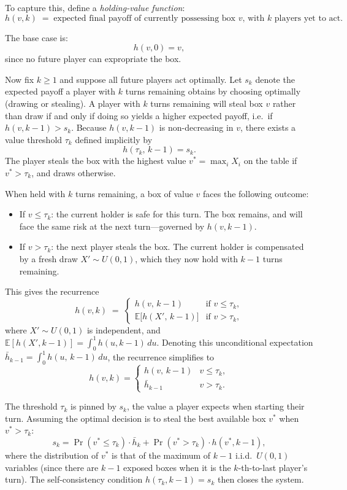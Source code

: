 \documentclass{article}
\begin{document}
To capture this, define a \emph{holding-value function}:
\[
h(v, k) \;=\; \text{expected final payoff of currently possessing box } v \text{, with } k \text{ players yet to act.}
\]

The base case is:
\[
h(v, 0) = v,
\]
since no future player can expropriate the box.

Now fix $k \geq 1$ and suppose all future players act optimally.
Let $s_k$ denote the expected payoff a player with $k$ turns remaining obtains by choosing optimally (drawing or stealing).
A player with $k$ turns remaining will steal box $v$ rather than draw if and only if doing so yields a higher expected payoff, i.e.\ if $h(v, k-1) > s_k$.
Because $h(v, k-1)$ is non-decreasing in $v$, there exists a value threshold $\tau_k$ defined implicitly by
\[
h(\tau_k,\, k-1) = s_k.
\]
The player steals the box with the highest value $v^* = \max_i X_i$ on the table if $v^* > \tau_k$, and draws otherwise.

When held with $k$ turns remaining, a box of value $v$ faces the following outcome:
\begin{itemize}
\item If $v \leq \tau_k$: the current holder is safe for this turn. The box remains, and will face the same risk at the next turn—governed by $h(v, k-1)$.
\item If $v > \tau_k$: the next player steals the box. The current holder is compensated by a fresh draw $X' \sim U(0,1)$, which they now hold with $k-1$ turns remaining.
\end{itemize}

This gives the recurrence
\[
h(v, k) \;=\;
\begin{cases}
h(v,\, k-1) & \text{if } v \leq \tau_k, \\
\mathbb{E}\bigl[h(X',\, k-1)\bigr] & \text{if } v > \tau_k,
\end{cases}
\]
where $X' \sim U(0,1)$ is independent, and $\mathbb{E}[h(X', k-1)] = \int_0^1 h(u, k-1)\,du$.
Denoting this unconditional expectation $\bar{h}_{k-1} = \int_0^1 h(u,\,k-1)\,du$, the recurrence simplifies to
\[
h(v, k) =
\begin{cases}
h(v,\, k-1) & v \leq \tau_k, \\
\bar{h}_{k-1} & v > \tau_k.
\end{cases}
\]

The threshold $\tau_k$ is pinned by $s_k$, the value a player expects when starting their turn.
Assuming the optimal decision is to steal the best available box $v^*$ when $v^* > \tau_k$:
\[
s_k = \Pr(v^* \leq \tau_k)\cdot \bar h_{k} + \Pr(v^* > \tau_k)\cdot h(v^*, k-1),
\]
where the distribution of $v^*$ is that of the maximum of $k-1$ i.i.d.\ $U(0,1)$ variables (since there are $k-1$ exposed boxes when it is the $k$-th-to-last player's turn). The self-consistency condition $h(\tau_k, k-1) = s_k$ then closes the system.
\end{document}
